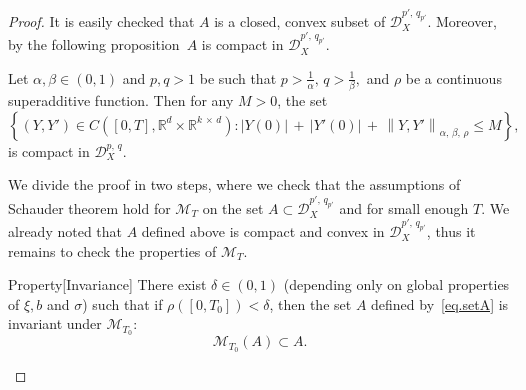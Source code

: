 \documentclass[AHL,Unicode,longabstracts,published]{cedram}
\newcommand{\scrD}{\mathscr{D}}
\newcommand{\calM}{\mathcal{M}}
\newcommand{\Rr}{{\mathbb{R}}}
\begin{document}
\begin{proof}
It is easily checked that $A$ is a closed, convex subset of $\scrD^{p',\,q_{p'}}_{X}$. Moreover, by the following proposition~$A$ is compact in $\scrD^{p',\,q_{p'}}_{X}$.

\begin{prop}\label{prop:compactness}
Let $\alpha, \beta\in (0,1)$ and $p, q>1$ be such that $p>\frac 1 {\alpha},\, q>\frac 1 {\beta},$ and $\rho$ be a continuous superadditive function. Then for any $M>0$, the set
\[
\left\{ \left(Y, Y'\right)\in C\left([0,T], \Rr^d\times \Rr^{k\,\times\,d}\right)\colon |Y(0)|\,+\,\left|Y'(0)\right|\,+\,\left\|Y, Y'\right\|_{\alpha,\,\beta,\,\rho}\leq M
\right\},
\]
is compact in $\scrD^{p,\,q}_{X}$.
\end{prop}


We divide the proof in two steps, where we check that the assumptions of Schauder theorem hold for $\calM_{T}$ on the set $A\subset\scrD^{p',\,q_{p'}}_{X }$ and for small enough $T$. We already noted that $A$ defined above is compact and convex in $\scrD^{p',\,q_{p'}}_{X}$, thus it remains to check the properties of $\calM_{T}$.

\begin{enonce}{Property}[Invariance]
There exist $\delta\in (0, 1)$ (depending only on global properties of $\xi, b$ and $\sigma$) such that if $\rho([0,T_0])<\delta$, then the set $A$ defined by~\eqref{eq.setA} is invariant under $\calM_{T_0}$:
\[
\calM_{T_0}(A)\subset A.
\]
\end{enonce}


\end{proof}
\end{document}
